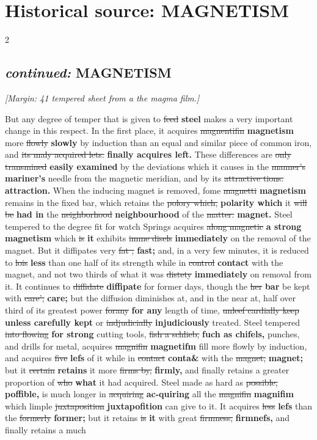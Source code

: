 \documentclass[10pt]{article}
\begin{document}
\section*{Historical source: MAGNETISM}
\begin{multicols}{2}
\subsection*{\textit{continued:} MAGNETISM}
{\small\itshape [Margin: 41 tempered sheet from a the magma film.]}\par
But any degree of temper that is given to \sout{feed} \textbf{steel} makes a very important change in this respect. In the first place, it acquires \sout{magnentifin} \textbf{magnetism} more \sout{flowly} \textbf{slowly} by induction than an equal and similar piece of common iron, and \sout{its maly acquired lets.} \textbf{finally acquires left.} These differences are \sout{only transmined} \textbf{easily examined} by the deviations which it causes in the \sout{manner’s} \textbf{mariner's} needle from the magnetic meridian, and by its \sout{attractive tions.} \textbf{attraction.} When the inducing magnet is removed, fome \sout{magnetti} \textbf{magnetism} remains in the fixed bar, which retains the \sout{polory which,} \textbf{polarity which} it \sout{will be} \textbf{had in} the \sout{neighborhood} \textbf{neighbourhood} of the \sout{matter.} \textbf{magnet.} Steel tempered to the degree fit for watch Springs acquires \sout{along magnetic} \textbf{a strong magnetism} which \sout{is} \textbf{it} exhibits \sout{imme disels} \textbf{immediately} on the removal of the magnet. But it diffipates very \sout{fat ;} \textbf{fast;} and, in a very few minutes, it is reduced to \sout{lois} \textbf{less} than one half of its strength while in \sout{control} \textbf{contact} with the magnet, and not two thirds of what it was \sout{distety} \textbf{immediately} on removal from it. It continues to \sout{diffidate} \textbf{diffipate} for former days, though the \sout{her} \textbf{bar} be kept with \sout{care';} \textbf{care;} but the diffusion diminishes at, and in the near at, half over third of its greatest power \sout{forany} \textbf{for any} length of time, \sout{unleef cardially keep} \textbf{unless carefully kept} or \sout{indjudicially} \textbf{injudiciously} treated. Steel tempered \sout{into flowing} \textbf{for strong} cutting tools, \sout{fish a schlieb,} \textbf{fuch as chifels,} punches, and drills for metal, acquires \sout{magnifin} \textbf{magnetifm} fill more flowly by induction, and acquires \sout{five} \textbf{lefs} of it while in \sout{contact} \textbf{conta\&} with the \sout{magnet,} \textbf{magnet;} but it \sout{certain} \textbf{retains} it more \sout{firms by,} \textbf{firmly,} and finally retains a greater proportion of \sout{who} \textbf{what} it had acquired. Steel made as hard as \sout{possible,} \textbf{poffible,} is much longer in \sout{acquiring} \textbf{ac-quiring} all the \sout{magnifin} \textbf{magnifim} which limple \sout{juxtaposition} \textbf{juxtapofition} can give to it. It acquires \sout{less} \textbf{lefs} than the \sout{formerly} \textbf{former;} but it retains \sout{is} \textbf{it} with great \sout{firmness,} \textbf{firmnefs,} and finally retains a much 
\end{multicols}
\end{document}
